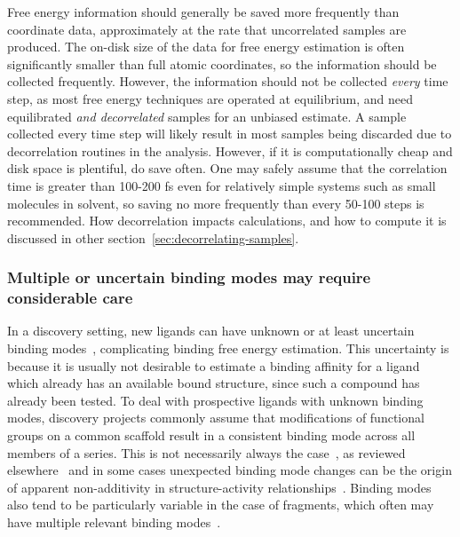 \documentclass[9pt,bestpractices]{livecoms}
\begin{document}
Free energy information should generally be saved more frequently than coordinate data, approximately at the rate that uncorrelated samples are produced.  
The on-disk size of the data for free energy estimation is often significantly smaller than full atomic coordinates, so the information should be collected frequently. 
However, the information should not be collected \textit{every} time step, as most free energy techniques are operated at equilibrium, and need equilibrated \textit{and decorrelated} samples for an unbiased estimate.
A sample collected every time step will likely result in most samples being discarded due to decorrelation routines in the analysis. However, if it is computationally cheap and disk space is plentiful, do save often. One may safely assume that the correlation time is greater than 100-200 fs even for relatively simple systems such as small molecules in solvent, so saving no more frequently than every 50-100 steps is recommended. 
How decorrelation impacts calculations, and how to compute it is discussed in other section~\ref{sec:decorrelating-samples}. 
%
\subsubsection{Multiple or uncertain binding modes may require considerable care}
\label{sec:multiple_binding_modes}
In a discovery setting, new ligands can have unknown or at least uncertain binding modes~\cite{kaus2015how, plountprice2000analysis,mobley2009binding,calabro2016elucidation},  complicating binding free energy estimation.
This uncertainty is because it is usually not desirable to estimate a binding affinity for a ligand which already has an available bound structure, since such a compound has already been tested.
To deal with prospective ligands with unknown binding modes, discovery projects commonly assume that modifications of functional groups on a common scaffold result in a consistent binding mode across all members of a series.
This is not necessarily always the case~\cite{kaus2015how}, as reviewed elsewhere~\cite{mobley2009binding} and in some cases unexpected binding mode changes can be the origin of apparent non-additivity in structure-activity relationships~\cite{calabro2016elucidation}.
Binding modes also tend to be particularly variable in the case of fragments, which often may have multiple relevant binding modes~\cite{}.
%
\end{document}
